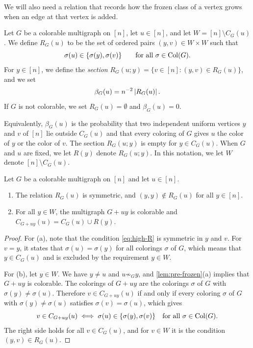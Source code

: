 We will also need a relation that records how the frozen class of a vertex grows when an edge at that vertex is added.

\begin{definition}\label{def:high-relation}
Let $G$ be a colorable multigraph on $[n]$, let $u \in [n]$, and let $W = [n] \setminus C_G(u)$. We define $R_G(u)$ to be the set of ordered pairs $(y, v) \in W \times W$ such that
\begin{equation}\label{eq:high-R}
\sigma(u) \in \{ \sigma(y), \sigma(v) \} \qquad \text{for all } \sigma \in \operatorname{Col}(G).
\end{equation}
For $y \in [n]$, we define the \emph{section} $R_G(u; y) = \{ v \in [n] : (y, v) \in R_G(u) \}$, and we set
\begin{equation}\label{eq:high-beta}
\beta_G(u) = n^{-2} \left|R_G(u)\right|.
\end{equation}
If $G$ is not colorable, we set $R_G(u) = \emptyset$ and $\beta_G(u) = 0$.
\end{definition}

Equivalently, $\beta_G(u)$ is the probability that two independent uniform vertices $y$ and $v$ of $[n]$ lie outside $C_G(u)$ and that every coloring of $G$ gives $u$ the color of $y$ or the color of $v$. The section $R_G(u; y)$ is empty for $y \in C_G(u)$. When $G$ and $u$ are fixed, we let $R(y)$ denote $R_G(u; y)$. In this notation, we let $W$ denote $[n] \setminus C_G(u)$.

\begin{lemma}\label{lem:high-relation}
Let $G$ be a colorable multigraph on $[n]$ and let $u \in [n]$.
\begin{enumerate}[label=(\alph*)]
\item The relation $R_G(u)$ is symmetric, and $(y, y) \notin R_G(u)$ for all $y \in [n]$.
\item For all $y \in W$, the multigraph $G + uy$ is colorable and $C_{G + uy}(u) = C_G(u) \cup R(y)$.
\end{enumerate}
\end{lemma}

\begin{proof}
For (a), note that the condition \eqref{eq:high-R} is symmetric in $y$ and $v$. For $v = y$, it states that $\sigma(u) = \sigma(y)$ for all colorings $\sigma$ of $G$, which means that $y \in C_G(u)$ and is excluded by the requirement $y \in W$.

For (b), let $y \in W$. We have $y \ne u$ and $u \not \sim_G y$, and \cref{lem:pre-frozen}(a) implies that $G + uy$ is colorable. The colorings of $G + uy$ are the colorings $\sigma$ of $G$ with $\sigma(y) \ne \sigma(u)$. Therefore $v \in C_{G + uy}(u)$ if and only if every coloring $\sigma$ of $G$ with $\sigma(y) \ne \sigma(u)$ satisfies $\sigma(v) = \sigma(u)$, which gives
\[
v \in C_{G + uy}(u) \iff \sigma(u) \in \{ \sigma(y), \sigma(v) \} \quad \text{for all } \sigma \in \operatorname{Col}(G).
\]
The right side holds for all $v \in C_G(u)$, and for $v \in W$ it is the condition $(y, v) \in R_G(u)$.
\end{proof}

